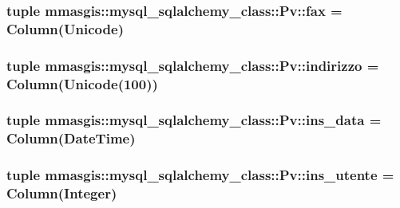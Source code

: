 \label{classmmasgis_1_1mysql__sqlalchemy__class_1_1Pv_ab639489c7a3c20b8c912aa596cf57feb}
\hypertarget{classmmasgis_1_1mysql__sqlalchemy__class_1_1Pv_a4d6caac4762ddec2bb903f9b6d605986}{
\subsubsection[{fax}]{\setlength{\rightskip}{0pt plus 5cm}tuple {\bf mmasgis::mysql\_\-sqlalchemy\_\-class::Pv::fax} = Column(Unicode)}}
\label{classmmasgis_1_1mysql__sqlalchemy__class_1_1Pv_a4d6caac4762ddec2bb903f9b6d605986}
\hypertarget{classmmasgis_1_1mysql__sqlalchemy__class_1_1Pv_a05857055cd2ca17aa9301378e01a0972}{
\subsubsection[{indirizzo}]{\setlength{\rightskip}{0pt plus 5cm}tuple {\bf mmasgis::mysql\_\-sqlalchemy\_\-class::Pv::indirizzo} = Column(Unicode(100))}}
\label{classmmasgis_1_1mysql__sqlalchemy__class_1_1Pv_a05857055cd2ca17aa9301378e01a0972}
\hypertarget{classmmasgis_1_1mysql__sqlalchemy__class_1_1Pv_a40d1b26ee7357a0654dcd007b4a86ea2}{
\subsubsection[{ins\_\-data}]{\setlength{\rightskip}{0pt plus 5cm}tuple {\bf mmasgis::mysql\_\-sqlalchemy\_\-class::Pv::ins\_\-data} = Column(DateTime)}}
\label{classmmasgis_1_1mysql__sqlalchemy__class_1_1Pv_a40d1b26ee7357a0654dcd007b4a86ea2}
\hypertarget{classmmasgis_1_1mysql__sqlalchemy__class_1_1Pv_a271db5bef67ae1ce813f5a288f04009d}{
\subsubsection[{ins\_\-utente}]{\setlength{\rightskip}{0pt plus 5cm}tuple {\bf mmasgis::mysql\_\-sqlalchemy\_\-class::Pv::ins\_\-utente} = Column(Integer)}}
